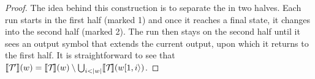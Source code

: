 \begin{proof}
	The idea behind this construction is to separate the \vpann in two halves. Each run starts in the first half (marked 1) and once it reaches a final state, it changes into the second half (marked 2). The run then stays on the second half until it sees an output symbol that extends the current output, upon which it returns to the first half.
	It is straightforward to see that $\llbracket \mathcal{T}\!' \rrbracket(w) = \llbracket \mathcal{T}\! \rrbracket(w) \setminus \bigcup_{i < |w|} \llbracket \mathcal{T}\! \rrbracket(w[1, i\rangle)$.
	

\end{proof}
